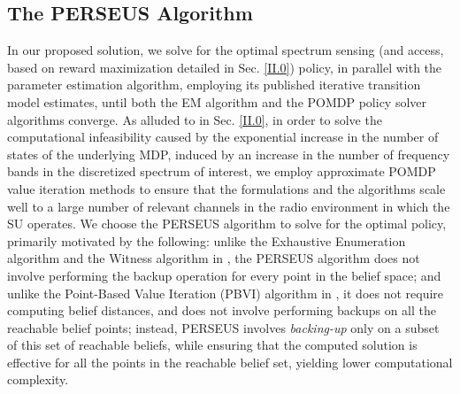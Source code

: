 \documentclass[10pt, twocolumn]{IEEEtran}
\begin{document}
\subsection{The PERSEUS Algorithm}\label{II.II}
In our proposed solution, we solve for the optimal spectrum sensing (and access, based on reward maximization detailed in Sec. \ref{II.0}) policy, in parallel with the parameter estimation algorithm, employing its published iterative transition model estimates, until both the EM algorithm and the POMDP policy solver algorithms converge. As alluded to in Sec. \ref{II.0}, in order to solve the computational infeasibility caused by the exponential increase in the number of states of the underlying MDP, induced by an increase in the number of frequency bands in the discretized spectrum of interest, we employ approximate POMDP value iteration methods to ensure that the formulations and the algorithms scale well to a large number of relevant channels in the radio environment in which the SU operates. We choose the PERSEUS algorithm \cite{WCL:13} to solve for the optimal policy, primarily motivated by the following: unlike the Exhaustive Enumeration algorithm and the Witness algorithm in \cite{PUOccupancy:18}, the PERSEUS algorithm does not involve performing the backup operation for every point in the belief space; and unlike the Point-Based Value Iteration (PBVI) algorithm in \cite{PUOccupancy:17}, it does not require computing belief distances, and does not involve performing backups on all the reachable belief points; instead, PERSEUS involves \emph{backing-up} only on a subset of this set of reachable beliefs, while ensuring that the computed solution is effective for all the points in the reachable belief set, yielding lower computational complexity.
\end{document}
